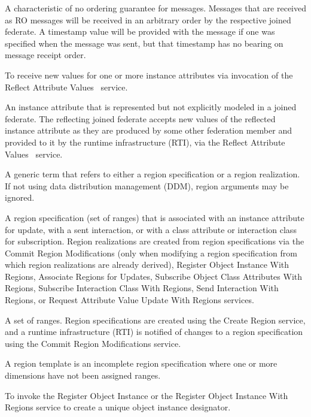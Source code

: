  A characteristic of no ordering guarantee for messages. Messages that are received as RO messages will be received in an arbitrary order by the respective joined federate. A timestamp value will be provided with the message if one was specified when the message was sent, but that timestamp has no bearing on message receipt order.

 To receive new values for one or more instance attributes via invocation of the Reflect Attribute Values \rtiinitiated\ service.

 An instance attribute that is represented but not explicitly modeled in a joined federate. The reflecting joined federate accepts new values of the reflected instance attribute as they are produced by some other federation member and provided to it by the runtime infrastructure (RTI), via the Reflect Attribute Values \rtiinitiated\ service.

 A generic term that refers to either a region specification or a region realization. If not using data distribution management (DDM), region arguments may be ignored.

 A region specification (set of ranges) that is associated with an instance attribute for update, with a sent interaction, or with a class attribute or interaction class for subscription. Region realizations are created from region specifications via the Commit Region Modifications (only when modifying a region specification from which region realizations are already derived), Register Object Instance With Regions, Associate Regions for Updates, Subscribe Object Class Attributes With Regions, Subscribe Interaction Class With Regions, Send Interaction With Regions, or Request Attribute Value Update With Regions services.

 A set of ranges. Region specifications are created using the Create Region service, and a runtime infrastructure (RTI) is notified of changes to a region specification using the Commit Region Modifications service.

 A region template is an incomplete region specification where one or more dimensions have not been assigned ranges.

 To invoke the Register Object Instance or the Register Object Instance With Regions service to create a unique object instance designator.

